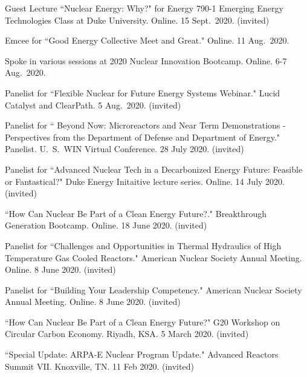 \begin{bibsection}
\item Guest Lecture ``Nuclear Energy: Why?" for Energy 790-1
Emerging Energy Technologies Class at Duke University. Online. 15 Sept.\ 2020.
(invited)

\item Emcee for ``Good Energy Collective Meet and Great."
Online. 11 Aug.\ 2020. 

\item Spoke in various sessions at 2020 Nuclear Innovation
Bootcamp. Online. 6-7 Aug.\ 2020. 

\item Panelist for ``Flexible Nuclear for Future Energy
Systems Webinar." Lucid Catalyst and ClearPath. 5 Aug.\ 2020. (invited) 

\item Panelist for `` Beyond Now: Microreactors and Near Term Demonstrations - Perspectives from
the Department of Defense and Department of Energy." Panelist. U.\ S.\ WIN Virtual
Conference. 28 July 2020. (invited) 

\item Panelist for ``Advanced Nuclear Tech in a Decarbonized Energy Future:
Feasible or Fantastical?" Duke Energy Initaitive lecture series.
Online. 14 July 2020. (invited)

\item ``How Can Nuclear Be Part of a Clean Energy Future?."
Breakthrough Generation Bootcamp. Online. 18 June 2020. (invited)

\item Panelist for ``Challenges and Opportunities in Thermal
Hydraulics of High Temperature Gas Cooled Reactors." American Nuclear Society Annual Meeting. Online. 8 June 2020. (invited)

\item Panelist for ``Building Your Leadership Competency."
American Nuclear Society Annual Meeting. Online. 8 June 2020. (invited)


\item ``How Can Nuclear Be Part of a Clean Energy Future?" G20
Workshop on Circular Carbon Economy. Riyadh, KSA. 5 March 2020. (invited)

\item ``Special Update: ARPA-E Nuclear Program Update." Advanced Reactors Summit VII. Knoxville, TN. 11 Feb 2020.
(invited)


\end{bibsection}
